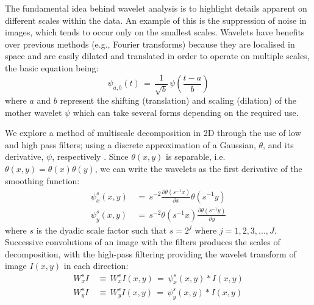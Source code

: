 \documentclass[namedreferences]{SolarPhysics}
\begin{document}
\begin{article}
The fundamental idea behind wavelet analysis is to highlight details apparent on different scales within the data. An example of this is the suppression of noise in images, which tends to occur only on the smallest scales. Wavelets have benefits over previous methods (e.g., Fourier transforms) because they are localised in space and are easily dilated and translated in order to operate on multiple scales, the basic equation being:
\begin{equation}
\psi_{a,b}(t)\,=\, \frac{1}{\sqrt{b}} \, \psi (\frac{t-a}{b})
\end{equation}
where $a$ and $b$ represent the shifting (translation) and scaling (dilation) of the mother wavelet $\psi$ which can take several forms depending on the required use. 

We explore a method of multiscale decomposition in 2D through the use of low and high pass filters; using a discrete approximation of a Gaussian, $\theta$, and its derivative, $\psi$, respectively \citep{2003A&A...398.1185S}. Since $\theta(x,y)$ is separable, i.e. $\theta(x,y)=\theta(x)\theta(y)$, we can write the wavelets as the first derivative of the smoothing function:
\begin{eqnarray}
\psi_{x}^{s}(x,y)\,&=\, s^{-2} \frac{\partial \theta(s^{-1}x)}{\partial x}\theta(s^{-1}y) \\
\psi_{y}^{s}(x,y)\,&=\, s^{-2} \theta(s^{-1}x)\frac{\partial \theta(s^{-1}y)}{\partial y}
\end{eqnarray}
where $s$ is the dyadic scale factor such that $s=2^j$ where $j=1,2,3,...,J$. Successive convolutions of an image with the filters produces the scales of decomposition, with the high-pass filtering providing the wavelet transform of image $I(x,y)$ in each direction:
\begin{eqnarray}
W_{x}^{s}I \,&\equiv\, W_{x}^s I(x,y)\,=\,\psi_{x}^s (x,y)*I(x,y) \\
W_{y}^{s}I \,&\equiv\, W_{y}^s I(x,y)\,=\,\psi_{y}^s (x,y)*I(x,y)
\end{eqnarray}


\end{article}
\end{document}
